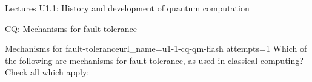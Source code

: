 \begin{edXsection}{Lectures U1.1: History and development of quantum computation}
\begin{edXvertical}{CQ: Mechanisms for fault-tolerance}
\begin{edXproblem}{Mechanisms for fault-tolerance}{url_name=u1-1-cq-qm-flash attempts=1}
Which of the following are mechanisms for fault-tolerance, as used in classical computing?  Check all which apply:


\end{edXproblem}


\end{edXvertical}


\end{edXsection}
